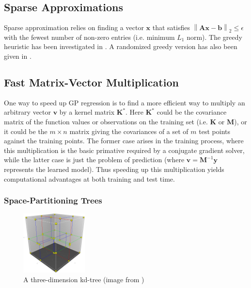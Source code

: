 \documentclass{article}
\begin{document}
\subsection{Sparse Approximations}
Sparse approximation relies on finding a vector $\mathbf{x}$ that satisfies $\left \| \mathbf{A}\mathbf{x} -\mathbf{b} \right \|_2\leq \epsilon $ with the fewest number of non-zero entries (i.e. minimum $L_1$ norm). The greedy heuristic has been investigated in \cite{natarajan}. A randomized greedy version has also been given in \cite{smolaGreedy}.

\subsection{Fast Matrix-Vector Multiplication}

One way to speed up GP regression is to find a more efficient way to multiply an arbitrary vector $\mathbf{v}$ by a kernel matrix $\mathbf{K^*}$. Here $\mathbf{K}^*$ could be the covariance matrix of the function values or observations on the training set (i.e. $\mathbf{K}$ or $\mathbf{M}$), or it could be the $m \times n$ matrix giving the covariances of a set of $m$ test points against the training points. The former case arises in the training process, where this multiplication is the basic primative required by a conjugate gradient solver, while the latter case is just the problem of prediction (where $\mathbf{v} = \mathbf{M}^{-1}\mathbf{y}$ represents the learned model). Thus speeding up this multiplication yields computational advantages at both training and test time. 

\subsubsection{Space-Partitioning Trees}
\begin{figure} 

  \centering
    \includegraphics[width=0.3\textwidth]{3dtree}
  \caption{A three-dimension kd-tree (image from \cite{wiki:kdtree})}
  \label{fig:kdtree}
\end{figure}
\end{document}
